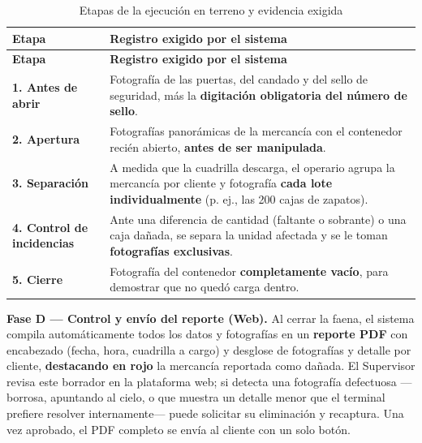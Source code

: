 {\estilotabla
\begin{longtable}{L{0.28\textwidth} L{0.66\textwidth}}

\caption{Etapas de la ejecución en terreno y evidencia exigida}
\label{tab:etapasterreno}
\\

\toprule
\textbf{Etapa} & \textbf{Registro exigido por el sistema} \\
\midrule
\endfirsthead

\toprule
\textbf{Etapa} & \textbf{Registro exigido por el sistema} \\
\midrule
\endhead

\textbf{1. Antes de abrir} &
Fotografía de las puertas, del candado y del sello de seguridad, más la \textbf{digitación
obligatoria del número de sello}. \\

\midrule

\textbf{2. Apertura} &
Fotografías panorámicas de la mercancía con el contenedor recién abierto, \textbf{antes de ser
manipulada}. \\

\midrule

\textbf{3. Separación} &
A medida que la cuadrilla descarga, el operario agrupa la mercancía por cliente y fotografía
\textbf{cada lote individualmente} (p. ej., las 200 cajas de zapatos). \\

\midrule

\textbf{4. Control de incidencias} &
Ante una diferencia de cantidad (faltante o sobrante) o una caja dañada, se separa la unidad
afectada y se le toman \textbf{fotografías exclusivas}. \\

\midrule

\textbf{5. Cierre} &
Fotografía del contenedor \textbf{completamente vacío}, para demostrar que no quedó carga
dentro. \\

\bottomrule

\end{longtable}
}

\noindent \textbf{Fase D --- Control y envío del reporte (Web).} Al cerrar la faena, el sistema compila
automáticamente todos los datos y fotografías en un \textbf{reporte PDF} con encabezado (fecha,
hora, cuadrilla a cargo) y desglose de fotografías y detalle por cliente, \textbf{destacando en
rojo} la mercancía reportada como dañada. El Supervisor revisa este borrador en la plataforma web;
si detecta una fotografía defectuosa ---borrosa, apuntando al cielo, o que muestra un detalle menor
que el terminal prefiere resolver internamente--- puede solicitar su eliminación y recaptura. Una
vez aprobado, el PDF completo se envía al cliente con un solo botón.

